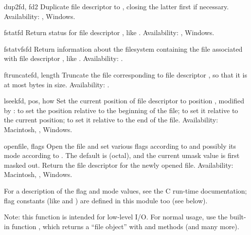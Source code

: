 \begin{funcdesc}{dup2}{fd, fd2}
Duplicate file descriptor  to , closing the latter
first if necessary.
Availability: \UNIX{}, Windows.
\end{funcdesc}

\begin{funcdesc}{fstat}{fd}
Return status for file descriptor , like .
Availability: \UNIX{}, Windows.
\end{funcdesc}

\begin{funcdesc}{fstatvfs}{fd}
Return information about the filesystem containing the file associated
with file descriptor , like .
Availability: \UNIX{}.
\end{funcdesc}

\begin{funcdesc}{ftruncate}{fd, length}
Truncate the file corresponding to file descriptor , 
so that it is at most  bytes in size.
Availability: \UNIX{}.
\end{funcdesc}

\begin{funcdesc}{lseek}{fd, pos, how}
Set the current position of file descriptor  to position
, modified by :  to set the position
relative to the beginning of the file;  to set it relative to
the current position;  to set it relative to the end of the
file.
Availability: Macintosh, \UNIX{}, Windows.
\end{funcdesc}

\begin{funcdesc}{open}{file, flags}
Open the file  and set various flags according to
 and possibly its mode according to .
The default  is  (octal), and the current umask
value is first masked out.  Return the file descriptor for the newly
opened file.
Availability: Macintosh, \UNIX{}, Windows.

For a description of the flag and mode values, see the C run-time
documentation; flag constants (like  and
) are defined in this module too (see below).

Note: this function is intended for low-level I/O.  For normal usage,
use the built-in function , which returns a ``file
object'' with  and  methods (and many
more).
\end{funcdesc}

